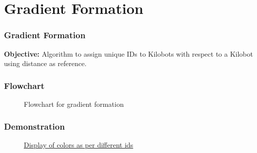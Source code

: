 \section{Gradient Formation}
\begin{frame}
	\frametitle{Gradient Formation}
		\textbf{Objective:} Algorithm to assign unique IDs to Kilobots with respect to a Kilobot using distance as reference.
\end{frame}

\begin{frame}
\frametitle{Flowchart}
\begin{figure}[H]
	\centering
	\caption{Flowchart for gradient formation}
	\label{fig:flowchart-gradient}
\end{figure}
\end{frame}

\begin{frame}
\frametitle{Demonstration}
\begin{figure}[H]
	\centering
	\caption{\href{https://drive.google.com/file/d/1JAcmaJzGgZXJqVzh5EeOXjp7_x3NBJIU/view}{Display of colors as per different ids}}
	\label{fig:gradient-color}
\end{figure}
\end{frame}


